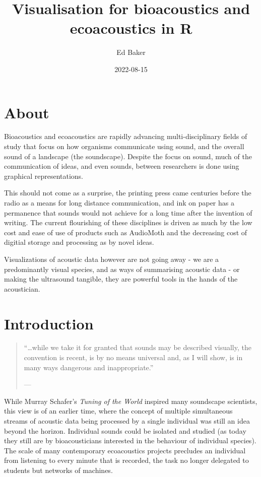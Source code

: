 \documentclass[
]{book}
\title{Visualisation for bioacoustics and ecoacoustics in R}
\author{Ed Baker}
\date{2022-08-15}
\begin{document}
\maketitle

{
\setcounter{tocdepth}{1}
\tableofcontents
}
\hypertarget{about}{%
\chapter*{About}\label{about}}

Bioacoustics and ecoacoustics are rapidly advancing multi-disciplinary fields of study that focus on how organisms communicate using sound, and the overall sound of a landscape (the soundscape). Despite the focus on sound, much of the communication of ideas, and even sounds, between researchers is done using graphical representations.

This should not come as a surprise, the printing press came centuries before the radio as a means for long distance communication, and ink on paper has a permanence that sounds would not achieve for a long time after the invention of writing. The current flourishing of these disciplines is driven as much by the low cost and ease of use of products such as AudioMoth and the decreasing cost of digitial storage and processing as by novel ideas.

Visualizations of acoustic data however are not going away - we are a predominantly visual species, and as ways of summarising acoustic data - or making the ultrasound tangible, they are powerful tools in the hands of the acoustician.

\hypertarget{intro}{%
\chapter{Introduction}\label{intro}}

\begin{quote}
``\ldots while we take it for granted that sounds may be described visually, the convention is recent, is by no means universal and, as I will show, is in many ways dangerous and inappropriate.''

\hfill --- \citet{schafer1977}
\end{quote}

While Murray Schafer's \emph{Tuning of the World} \citep{schafer1977} inspired many soundscape scientists, this view is of an earlier time, where the concept of multiple simultaneous streams of acoustic data being processed by a single individual was still an idea beyond the horizon. Individual sounds could be isolated and studied (as today they still are by bioacousticians interested in the behaviour of individual species). The scale of many contemporary ecoacoustics projects precludes an individual from listening to every minute that is recorded, the task no longer delegated to students but networks of machines.
\end{document}

